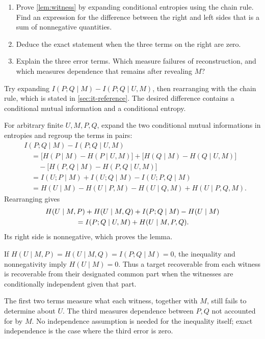 \documentclass[11pt]{article}
\begin{document}
\begin{exercise}
\label{ex:witness}\important
\begin{enumerate}
\item Prove \cref{lem:witness} by expanding conditional entropies using the
chain rule. Find an expression for the difference between the right and left
sides that is a sum of nonnegative quantities.
\item Deduce the exact statement when the three terms on the right are zero.
\item Explain the three error terms. Which measure failures of reconstruction,
and which measures dependence that remains after revealing $M$?
\end{enumerate}
\end{exercise}
\begin{hint}
Try expanding $I(P;Q\mid M)-I(P;Q\mid U,M)$, then rearranging with the
chain rule, which is stated in
\cref{sec:it-reference}.
The desired difference contains a conditional mutual information
and a conditional entropy.
\end{hint}
\begin{solution}[ex:witness]
For arbitrary finite $U,M,P,Q$, expand the two conditional mutual
informations in entropies and regroup the terms in pairs:
\begin{align*}
 &I(P;Q\mid M)-I(P;Q\mid U,M)\\
 &\quad=\bigl[H(P\mid M)-H(P\mid U,M)\bigr]+\bigl[H(Q\mid M)-H(Q\mid U,M)\bigr]\\
 &\qquad-\bigl[H(P,Q\mid M)-H(P,Q\mid U,M)\bigr]\\
 &\quad=I(U;P\mid M)+I(U;Q\mid M)-I(U;P,Q\mid M)\\
 &\quad=H(U\mid M)-H(U\mid P,M)-H(U\mid Q,M)+H(U\mid P,Q,M).
\end{align*}
Rearranging gives
\begin{align*}
 &H(U\mid M,P)+H(U\mid M,Q)+I(P;Q\mid M)-H(U\mid M)\\
 &\hspace{15mm}=I(P;Q\mid U,M)+H(U\mid M,P,Q).
\end{align*}
Its right side is nonnegative, which proves the lemma.

If $H(U\mid M,P)=H(U\mid M,Q)=I(P;Q\mid M)=0$, the inequality and
nonnegativity imply $H(U\mid M)=0$. Thus a target recoverable from each
witness is recoverable from their designated common part when the witnesses
are conditionally independent given that part.

The first two terms measure what each witness, together with $M$, still fails
to determine about $U$. The third measures dependence between $P,Q$ not
accounted for by $M$. No independence assumption is needed for the inequality
itself; exact independence is the case where the third error is zero.
\end{solution}
\end{document}
